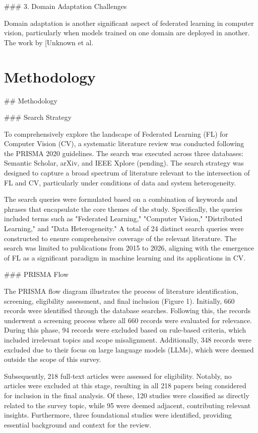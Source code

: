\documentclass[journal]{IEEEtran}
\begin{document}
\#\#\# 3. Domain Adaptation Challenges

Domain adaptation is another significant aspect of federated learning in computer vision, particularly when models trained on one domain are deployed in another. The work by [Unknown et al.

\section{Methodology}
\label{sec:methodology}

\#\# Methodology

\#\#\# Search Strategy

To comprehensively explore the landscape of Federated Learning (FL) for Computer Vision (CV), a systematic literature review was conducted following the PRISMA 2020 guidelines. The search was executed across three databases: Semantic Scholar, arXiv, and IEEE Xplore (pending). The search strategy was designed to capture a broad spectrum of literature relevant to the intersection of FL and CV, particularly under conditions of data and system heterogeneity.

The search queries were formulated based on a combination of keywords and phrases that encapsulate the core themes of the study. Specifically, the queries included terms such as "Federated Learning," "Computer Vision," "Distributed Learning," and "Data Heterogeneity." A total of 24 distinct search queries were constructed to ensure comprehensive coverage of the relevant literature. The search was limited to publications from 2015 to 2026, aligning with the emergence of FL as a significant paradigm in machine learning and its applications in CV.

\#\#\# PRISMA Flow

The PRISMA flow diagram illustrates the process of literature identification, screening, eligibility assessment, and final inclusion (Figure 1). Initially, 660 records were identified through the database searches. Following this, the records underwent a screening process where all 660 records were evaluated for relevance. During this phase, 94 records were excluded based on rule-based criteria, which included irrelevant topics and scope misalignment. Additionally, 348 records were excluded due to their focus on large language models (LLMs), which were deemed outside the scope of this survey.

Subsequently, 218 full-text articles were assessed for eligibility. Notably, no articles were excluded at this stage, resulting in all 218 papers being considered for inclusion in the final analysis. Of these, 120 studies were classified as directly related to the survey topic, while 95 were deemed adjacent, contributing relevant insights. Furthermore, three foundational studies were identified, providing essential background and context for the review.
\end{document}
